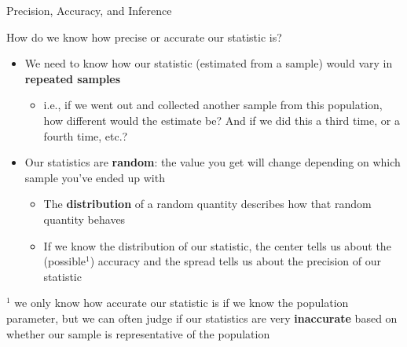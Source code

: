 \documentclass[10pt,t]{beamer}
\begin{document}
\begin{frame}{Precision, Accuracy, and Inference}
	
\vspace{-3 mm}
	
	
How do we know how precise or accurate our statistic is?

\vspace{0.1cm}

\begin{itemize}
	\item We need to know how our statistic (estimated from a sample) would vary in \textbf{repeated samples}
	\begin{itemize}
		\smallskip
		\item i.e., if we went out and collected another sample from this population, how different would the estimate be? And if we did this a third time, or a fourth time, etc.?
	\end{itemize}
\medskip
	\item Our statistics are \textbf{random}: the value you get will change depending on which sample you've ended up with
	\begin{itemize}
		\smallskip
		\item The \textbf{distribution} of a random quantity describes how that random quantity behaves
		\smallskip
		\item If we know the distribution of our statistic, the center tells us about the (possible${}^1$) accuracy and the spread tells us about the precision of our statistic
	\end{itemize}
\end{itemize}

\vspace{0.1cm}

\small ${}^1$ we only know how accurate our statistic is if we know the population parameter, but we can often judge if our statistics are very \textbf{inaccurate} based on whether our sample is representative of the population

\end{frame}
\end{document}
